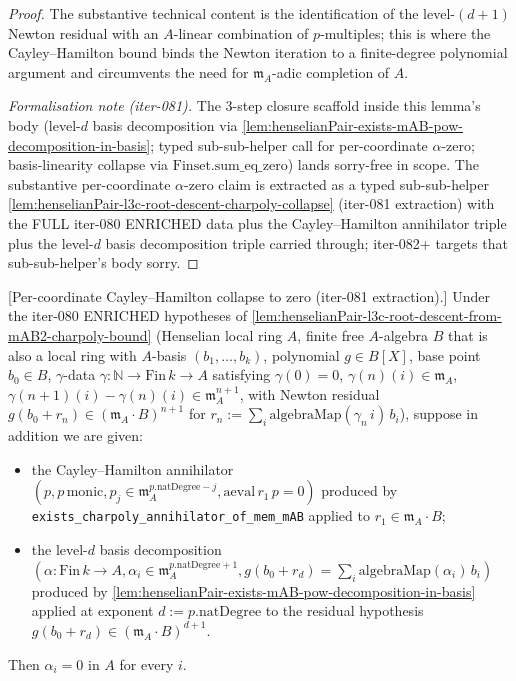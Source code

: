 \begin{proof}
The substantive technical content is the identification of the
level-$(d+1)$ Newton residual with an $A$-linear combination of
$p$-multiples; this is where the Cayley--Hamilton bound binds the
Newton iteration to a finite-degree polynomial argument and
circumvents the need for $\mathfrak m_A$-adic completion of $A$.

\textit{Formalisation note (iter-081).} The 3-step closure scaffold
inside this lemma's body (level-$d$ basis decomposition via
\cref{lem:henselianPair-exists-mAB-pow-decomposition-in-basis};
typed sub-sub-helper call for per-coordinate $\alpha$-zero;
basis-linearity collapse via $\mathrm{Finset.sum\_eq\_zero}$) lands
sorry-free in scope. The substantive per-coordinate
$\alpha$-zero claim is extracted as a typed sub-sub-helper
\cref{lem:henselianPair-l3c-root-descent-charpoly-collapse} (iter-081
extraction) with the FULL iter-080 ENRICHED data plus the
Cayley--Hamilton annihilator triple plus the level-$d$ basis
decomposition triple carried through; iter-082+ targets that
sub-sub-helper's body sorry.
\end{proof}

\begin{lemma}
\label{lem:henselianPair-l3c-root-descent-charpoly-collapse}
\leanok
{}
[Per-coordinate Cayley--Hamilton collapse to zero
(iter-081 extraction).]
Under the iter-080 ENRICHED hypotheses of
\cref{lem:henselianPair-l3c-root-descent-from-mAB2-charpoly-bound}
(Henselian local ring $A$, finite free $A$-algebra $B$ that is
also a local ring with $A$-basis $(b_1, \ldots, b_k)$,
polynomial $g \in B[X]$, base point $b_0 \in B$, $\gamma$-data
$\gamma : \mathbb N \to \mathrm{Fin}\,k \to A$ satisfying
$\gamma(0) = 0$, $\gamma(n)(i) \in \mathfrak m_A$,
$\gamma(n+1)(i) - \gamma(n)(i) \in \mathfrak m_A^{n+1}$, with
Newton residual $g(b_0 + r_n) \in (\mathfrak m_A \cdot B)^{n+1}$
for $r_n := \sum_i \mathrm{algebraMap}(\gamma_n\,i)\,b_i$), suppose
in addition we are given:
\begin{itemize}
\item the Cayley--Hamilton annihilator $(p, p\,\mathrm{monic},
  p_j \in \mathfrak m_A^{p.\mathrm{natDegree} - j},
  \mathrm{aeval}\,r_1\,p = 0)$ produced by
  \texttt{exists\_charpoly\_annihilator\_of\_mem\_mAB} applied to
  $r_1 \in \mathfrak m_A \cdot B$;
\item the level-$d$ basis decomposition $(\alpha : \mathrm{Fin}\,k
  \to A, \alpha_i \in \mathfrak m_A^{p.\mathrm{natDegree} + 1},
  g(b_0 + r_d) = \sum_i \mathrm{algebraMap}(\alpha_i)\,b_i)$
  produced by
  \cref{lem:henselianPair-exists-mAB-pow-decomposition-in-basis}
  applied at exponent $d := p.\mathrm{natDegree}$ to the residual
  hypothesis $g(b_0 + r_d) \in (\mathfrak m_A \cdot B)^{d+1}$.
\end{itemize}
Then $\alpha_i = 0$ in $A$ for every $i$.
\end{lemma}

